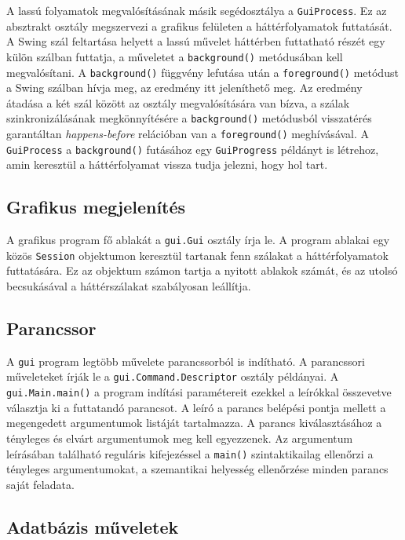 A lassú folyamatok megvalósításának másik segédosztálya a \texttt{GuiProcess}.
Ez az absztrakt osztály megszervezi a grafikus felületen a háttérfolyamatok futtatását.
A Swing szál feltartása helyett a lassú művelet háttérben futtatható részét egy külön szálban futtatja, a műveletet a \texttt{background()} metódusában kell megvalósítani.
A \texttt{background()} függvény lefutása után a \texttt{foreground()} metódust a Swing szálban hívja meg, az eredmény itt jeleníthető meg.
Az eredmény átadása a két szál között az osztály megvalósítására van bízva, a szálak szinkronizálásának megkönnyítésére a \texttt{background()} metódusból visszatérés garantáltan \textit{happens-before} relációban van a \texttt{foreground()} meghívásával.
A \texttt{GuiProcess} a \texttt{background()} futásához egy \texttt{GuiProgress} példányt is létrehoz, amin keresztül a háttérfolyamat vissza tudja jelezni, hogy hol tart.

\subsection{Grafikus megjelenítés}

A grafikus program fő ablakát a \texttt{gui.Gui} osztály írja le.
A program ablakai egy közös \texttt{Session} objektumon keresztül tartanak fenn szálakat a háttérfolyamatok futtatására.
Ez az objektum számon tartja a nyitott ablakok számát, és az utolsó becsukásával a háttérszálakat szabályosan leállítja.

\subsection{Parancssor}

A \texttt{gui} program legtöbb művelete parancssorból is indítható.
A parancssori műveleteket írják le a \texttt{gui.Command.Descriptor} osztály példányai. A \texttt{gui.Main.main()} a program indítási paramétereit ezekkel a leírókkal összevetve választja ki a futtatandó parancsot.
A leíró a parancs belépési pontja mellett a megengedett argumentumok listáját tartalmazza.
A parancs kiválasztásához a tényleges és elvárt argumentumok meg kell egyezzenek.
Az argumentum leírásában található reguláris kifejezéssel a \texttt{main()} szintaktikailag ellenőrzi a tényleges argumentumokat, a szemantikai helyesség ellenőrzése minden parancs saját feladata.

\subsection{Adatbázis műveletek}

